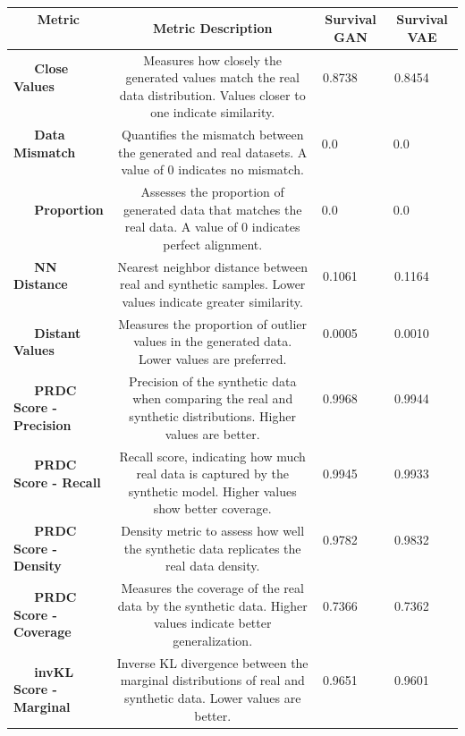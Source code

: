 \clearpage
\begin{landscape}
\begin{table}[H]
    \centering
    \begin{tabular}{|l|>{\tiny}c|c|c|}
\hline
    \textbf{Metric}                & \textbf{Metric Description} & \textbf{Survival GAN} & \textbf{Survival VAE} \\ \hline
    \textbf{Close Values}          & Measures how closely the generated values match the real data distribution. Values closer to one indicate similarity. & 0.8738           & 0.8454           \\ \hline
    \textbf{Data Mismatch}         & Quantifies the mismatch between the generated and real datasets. A value of 0 indicates no mismatch. & 0.0              & 0.0              \\ \hline
    \textbf{Proportion}            & Assesses the proportion of generated data that matches the real data. A value of 0 indicates perfect alignment. & 0.0              & 0.0              \\ \hline
    \textbf{NN Distance}           & Nearest neighbor distance between real and synthetic samples. Lower values indicate greater similarity. & 0.1061           & 0.1164           \\ \hline
    \textbf{Distant Values}        & Measures the proportion of outlier values in the generated data. Lower values are preferred. & 0.0005           & 0.0010           \\ \hline
    \textbf{PRDC Score - Precision}& Precision of the synthetic data when comparing the real and synthetic distributions. Higher values are better. & 0.9968           & 0.9944           \\ \hline
    \textbf{PRDC Score - Recall}   & Recall score, indicating how much real data is captured by the synthetic model. Higher values show better coverage. & 0.9945           & 0.9933           \\ \hline
    \textbf{PRDC Score - Density}  & Density metric to assess how well the synthetic data replicates the real data density. & 0.9782           & 0.9832           \\ \hline
    \textbf{PRDC Score - Coverage} & Measures the coverage of the real data by the synthetic data. Higher values indicate better generalization. & 0.7366           & 0.7362           \\ \hline
    \textbf{invKL Score - Marginal}& Inverse KL divergence between the marginal distributions of real and synthetic data. Lower values are better. & 0.9651           & 0.9601           \\ \hline

\end{tabular}
\end{table}
\end{landscape}
